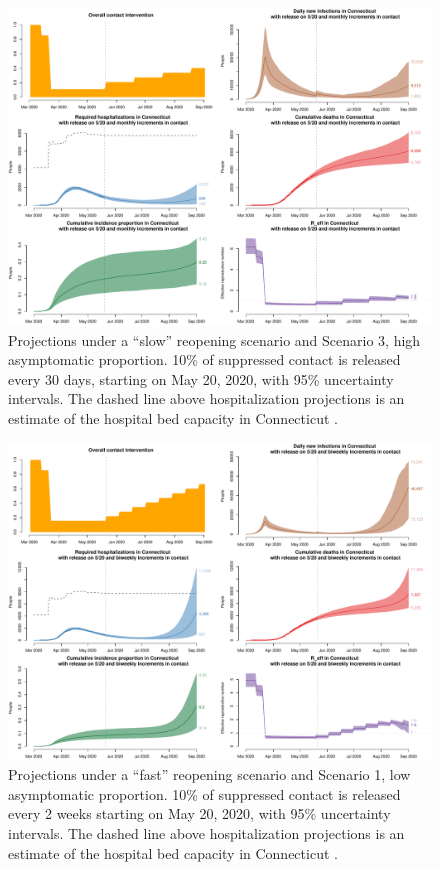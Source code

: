 \documentclass[11pt]{article}
\begin{document}
\begin{figure} %
	\centering
	\includegraphics[width=.9\textwidth]{figures/slow_high_full.pdf}
	\caption{Projections under a ``slow'' reopening scenario and Scenario 3, high asymptomatic proportion. 10\% of suppressed contact is released every 30 days, starting on May 20, 2020, with 95\% uncertainty intervals. The dashed line above hospitalization projections is an estimate of the hospital bed capacity in Connecticut \citep{CHAwebsite}. }
	\label{fig:slow_high}
\end{figure}


\begin{figure} %
	\centering
	\includegraphics[width=.9\textwidth]{figures/fast_low_full.pdf}
	\caption{Projections under a ``fast'' reopening scenario and Scenario 1, low asymptomatic proportion. 10\% of suppressed contact is released every 2 weeks starting on May 20, 2020, with 95\% uncertainty intervals. The dashed line above hospitalization projections is an estimate of the hospital bed capacity in Connecticut \citep{CHAwebsite}. }
	\label{fig:fast_low}
\end{figure}
\end{document}
